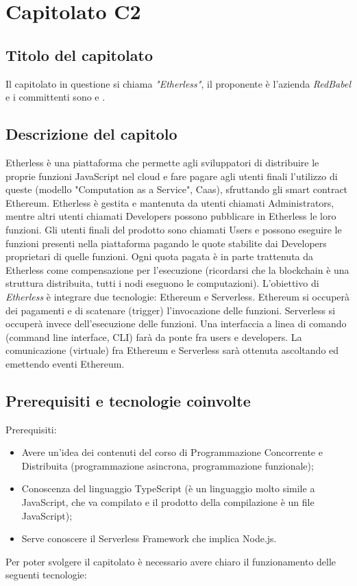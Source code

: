 \section{Capitolato C2}
\subsection{Titolo del capitolato}
Il capitolato in questione si chiama \textit{"Etherless"}, il proponente è l'azienda \textit{RedBabel} e i committenti sono \VT{} e \CR{}.

\subsection{Descrizione del capitolo}
Etherless è una piattaforma che permette agli sviluppatori di distribuire le proprie funzioni JavaScript nel cloud e fare pagare agli utenti finali l'utilizzo di queste (modello "Computation as a Service", Caas), sfruttando gli smart contract Ethereum. 
Etherless è gestita e mantenuta da utenti chiamati Administrators, mentre altri utenti chiamati Developers possono pubblicare in Etherless le loro funzioni. Gli utenti finali del prodotto sono chiamati Users e possono eseguire le funzioni presenti nella piattaforma pagando le quote stabilite dai Developers proprietari di quelle funzioni. Ogni quota pagata è in parte trattenuta da Etherless come compensazione per l'esecuzione (ricordarsi che la blockchain è una struttura distribuita, tutti i nodi eseguono le computazioni).
L'obiettivo di \textit{Etherless} è integrare due tecnologie: Ethereum e Serverless. Ethereum si occuperà dei pagamenti e di scatenare (trigger) l'invocazione delle funzioni. Serverless si occuperà invece dell'esecuzione delle funzioni. Una interfaccia a linea di comando (command line interface, CLI) farà da ponte fra users e developers. La comunicazione (virtuale) fra Ethereum e Serverless sarà ottenuta ascoltando ed emettendo eventi Ethereum.

\subsection{Prerequisiti e tecnologie coinvolte}
Prerequisiti:
\begin{itemize}
\item Avere un'idea dei contenuti del corso di Programmazione Concorrente e Distribuita (programmazione asincrona, programmazione funzionale);
\item Conoscenza del linguaggio TypeScript (\`e un linguaggio molto simile a JavaScript, che va compilato e il prodotto della compilazione \`e un file JavaScript);
\item Serve conoscere il Serverless Framework che implica Node.js.
\end{itemize}
Per poter svolgere il capitolato \`e necessario avere chiaro il funzionamento delle seguenti tecnologie:

